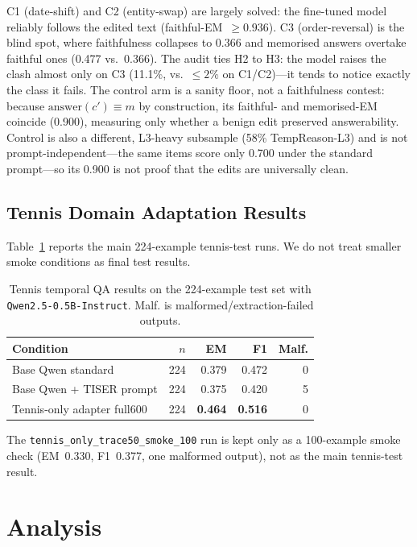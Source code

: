 \documentclass[conference]{IEEEtran}
\begin{document}
C1 (date-shift) and C2 (entity-swap) are largely solved: the fine-tuned model reliably follows the edited text (faithful-EM~${\geq}0.936$). C3 (order-reversal) is the blind spot, where faithfulness collapses to 0.366 and memorised answers overtake faithful ones (0.477 vs.\ 0.366). The audit ties H2 to H3: the model raises the clash almost only on C3 (11.1\%, vs.\ ${\leq}2\%$ on C1/C2)---it tends to notice exactly the class it fails. The control arm is a sanity floor, not a faithfulness contest: because $\text{answer}(c'){\equiv}m$ by construction, its faithful- and memorised-EM coincide (0.900), measuring only whether a benign edit preserved answerability. Control is also a different, L3-heavy subsample (58\% TempReason-L3) and is not prompt-independent---the same items score only 0.700 under the standard prompt---so its 0.900 is not proof that the edits are universally clean.

\subsection{Tennis Domain Adaptation Results}

Table~\ref{tab:tennis-final} reports the main 224-example tennis-test runs. We do not treat smaller smoke conditions as final test results.

\begin{table}[t]
\centering
\caption{Tennis temporal QA results on the 224-example test set with \texttt{Qwen2.5-0.5B-Instruct}. Malf. is malformed/extraction-failed outputs.}
\label{tab:tennis-final}
\setlength{\tabcolsep}{4pt}
{\footnotesize
\begin{tabular}{lrrrr}
\toprule
\textbf{Condition} & \textbf{$n$} & \textbf{EM} & \textbf{F1} & \textbf{Malf.} \\
\midrule
Base Qwen standard & 224 & 0.379 & 0.472 & 0 \\
Base Qwen + TISER prompt & 224 & 0.375 & 0.420 & 5 \\
Tennis-only adapter full600 & 224 & \textbf{0.464} & \textbf{0.516} & 0 \\
\bottomrule
\end{tabular}
}
\end{table}

The \texttt{tennis\_only\_trace50\_smoke\_100} run is kept only as a 100-example smoke check (EM~0.330, F1~0.377, one malformed output), not as the main tennis-test result.

\section{Analysis}
\end{document}
